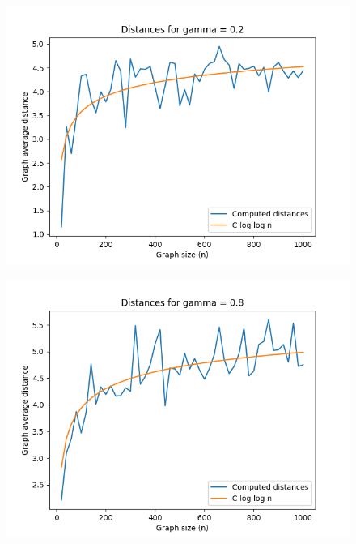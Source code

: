 \documentclass[a4paper]{article}
\begin{document}
\begin{minipage}{80mm}
	\begin{figure}[H]
		\includegraphics[scale=0.5]{loglog_gamma_02.png}
		\label{Fig5}
	\end{figure}
\end{minipage}
\begin{minipage}{80mm}
	\begin{figure}[H]
		\includegraphics[scale=0.5]{loglog_gamma_08.png}
		\label{Fig6}
	\end{figure}
\end{minipage}
\end{document}
